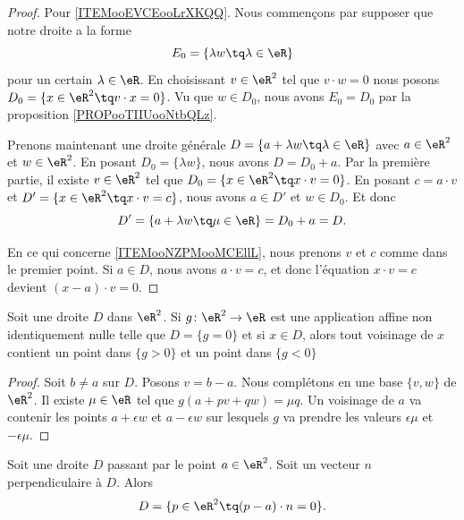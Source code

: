 \begin{proof}
	Pour \ref{ITEMooEVCEooLrXKQQ}. Nous commençons par supposer que notre droite a la forme
	\begin{equation}
		E_0=\{ \lambda w\tq \lambda\in \eR \}
	\end{equation}
	pour un certain \( \lambda\in \eR\). En choisissant \( v\in \eR^2\) tel que \( v\cdot w=0\) nous posons \( D_0=\{ x\in \eR^2\tq v\cdot x=0 \}\). Vu que \( w\in D_0\), nous avons \( E_0=D_0\) par la proposition \ref{PROPooTIIUooNtbQLz}.

	Prenons maintenant une droite générale  \( D=\{ a+\lambda w\tq \lambda\in \eR \}\) avec \( a\in \eR^2\) et \( w\in \eR^2\). En posant \( D_0=\{ \lambda w \}\), nous avons \( D=D_0+a\). Par la première partie, il existe \( v\in \eR^2\) tel que \( D_0=\{ x\in \eR^2\tq x\cdot v=0 \}\). En posant \( c=a\cdot v\) et \( D'=\{ x\in \eR^2\tq x\cdot v=c \}\), nous avons \( a\in D'\) et \( w\in D_0\). Et donc
	\begin{equation}
		D'=\{ a+\lambda w\tq \mu \in \eR \}=D_0+a=D.
	\end{equation}

	En ce qui concerne \ref{ITEMooNZPMooMCEllL}, nous prenons \( v\) et \( c\) comme dans le premier point. Si \( a\in D\), nous avons \( a\cdot v=c\), et donc l'équation \( x\cdot v=c\) devient \( (x-a)\cdot v=0\).
\end{proof}


\begin{proposition}	\label{PROPooBNBGooUUAbtm}
	Soit une droite \( D\) dans \( \eR^2\). Si \(g \colon \eR^2 \to \eR  \) est une application affine non identiquement nulle telle que \( D=\{ g=0 \}\) et si \( x\in D\), alors tout voisinage de \( x\) contient un point dans \( \{ g>0 \}\) et un point dans \( \{ g<0 \}\)
\end{proposition}

\begin{proof}
	Soit \( b\neq a\) sur \( D\). Posons \( v=b-a\). Nous complétons en une base \( \{ v,w \}\) de \( \eR^2\). Il existe \( \mu\in \eR\) tel que \( g(a+pv+qw)=\mu q\). Un voisinage de \( a\) va contenir les points \( a+\epsilon w\) et \( a-\epsilon w\) sur lesquels \( g\) va prendre les valeurs \( \epsilon \mu\) et \( -\epsilon\mu\).
\end{proof}


\begin{proposition}	\label{PROPooDWYSooGvwBty}
	Soit une droite \( D\) passant par le point \( a\in \eR^2\). Soit un vecteur \( n\) perpendiculaire à \( D\). Alors
	\begin{equation}
		D=\{ p\in \eR^2\tq (p-a)\cdot n=0 \}.
	\end{equation}
\end{proposition}


